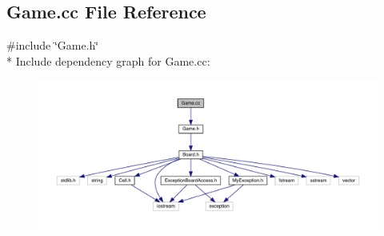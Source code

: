 \hypertarget{a00105}{}\subsection{Game.\+cc File Reference}
\label{a00105}
{\ttfamily \#include \char`\"{}Game.\+h\char`\"{}}\\*
Include dependency graph for Game.\+cc\+:\nopagebreak
\begin{figure}[H]
\begin{center}
\leavevmode
\includegraphics[width=350pt]{a00140}
\end{center}
\end{figure}
